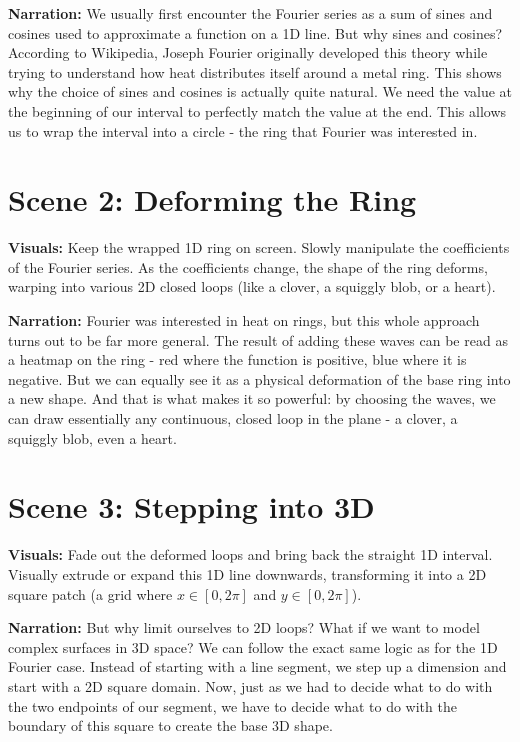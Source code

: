 \documentclass[12pt]{article}
\begin{document}
\textbf{Narration:}
We usually first encounter the Fourier series as a sum of sines and cosines used to approximate a function on a 1D line. But why sines and cosines? According to Wikipedia, Joseph Fourier originally developed this theory while trying to understand how heat distributes itself around a metal ring. This shows why the choice of sines and cosines is actually quite natural. We need the value at the beginning of our interval to perfectly match the value at the end. This allows us to wrap the interval into a circle - the ring that Fourier was interested in.

\section*{Scene 2: Deforming the Ring}
\textbf{Visuals:}
Keep the wrapped 1D ring on screen. Slowly manipulate the coefficients of the Fourier series. As the coefficients change, the shape of the ring deforms, warping into various 2D closed loops (like a clover, a squiggly blob, or a heart).

\textbf{Narration:}
Fourier was interested in heat on rings, but this whole approach turns out to be far more general. The result of adding these waves can be read as a heatmap on the ring - red where the function is positive, blue where it is negative. But we can equally see it as a physical deformation of the base ring into a new shape. And that is what makes it so powerful: by choosing the waves, we can draw essentially any continuous, closed loop in the plane - a clover, a squiggly blob, even a heart.

\section*{Scene 3: Stepping into 3D}
\textbf{Visuals:}
Fade out the deformed loops and bring back the straight 1D interval. Visually extrude or expand this 1D line downwards, transforming it into a 2D square patch (a grid where $x \in [0, 2\pi]$ and $y \in [0, 2\pi]$). 

\textbf{Narration:}
But why limit ourselves to 2D loops? What if we want to model complex surfaces in 3D space? We can follow the exact same logic as for the 1D Fourier case. Instead of starting with a line segment, we step up a dimension and start with a 2D square domain. Now, just as we had to decide what to do with the two endpoints of our segment, we have to decide what to do with the boundary of this square to create the base 3D shape.
\end{document}

